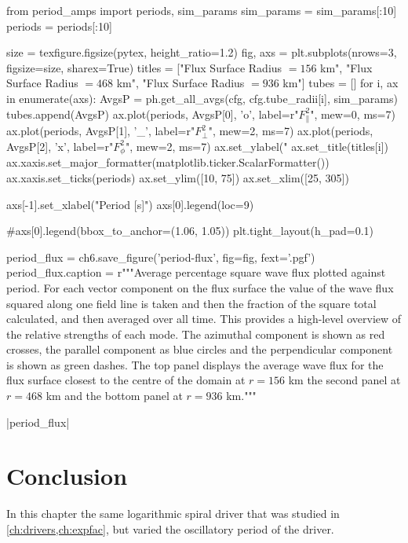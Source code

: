 \begin{pycode}[chapter6]

from period_amps import periods, sim_params
sim_params = sim_params[:10]
periods = periods[:10]

size = texfigure.figsize(pytex, height_ratio=1.2)
fig, axs = plt.subplots(nrows=3, figsize=size, sharex=True)
titles = ["Flux Surface Radius $=156$ km", "Flux Surface Radius $=468$ km", "Flux Surface Radius $=936$ km"]
tubes = []
for i, ax in enumerate(axs):
    AvgsP = ph.get_all_avgs(cfg, cfg.tube_radii[i], sim_params)
    tubes.append(AvgsP)
    ax.plot(periods, AvgsP[0], 'o', label=r"$F_\parallel^2$", mew=0, ms=7)
    ax.plot(periods, AvgsP[1], '_', label=r"$F_\perp^2$", mew=2, ms=7)
    ax.plot(periods, AvgsP[2], 'x', label=r"$F_\phi^2$", mew=2, ms=7)
    ax.set_ylabel("%
    ax.set_title(titles[i])
    ax.xaxis.set_major_formatter(matplotlib.ticker.ScalarFormatter())
    ax.xaxis.set_ticks(periods)
    ax.set_ylim([10, 75])
    ax.set_xlim([25, 305])

axs[-1].set_xlabel("Period [s]")
axs[0].legend(loc=9)

#axs[0].legend(bbox_to_anchor=(1.06, 1.05))
plt.tight_layout(h_pad=0.1)

period_flux = ch6.save_figure('period-flux', fig=fig, fext='.pgf')
period_flux.caption = r"""Average percentage square wave flux plotted against period. For each vector component on the flux surface the value of the wave flux squared along one field line is taken and then the fraction of the square total calculated, and then averaged over all time. This provides a high-level overview of the relative strengths of each mode. The azimuthal component is shown as red crosses, the parallel component as blue circles and the perpendicular component is shown as green dashes. The top panel displays the average wave flux for the flux surface closest to the centre of the domain at $r=156$ km the second panel at $r=468$ km and the bottom panel at $r=936$ km."""

\end{pycode}

\py[chapter6]|period_flux|

\section{Conclusion}\label{sec:conclusion}

In this chapter the same logarithmic spiral driver that was studied in \cref{ch:drivers,ch:expfac}, but varied the oscillatory period of the driver.


